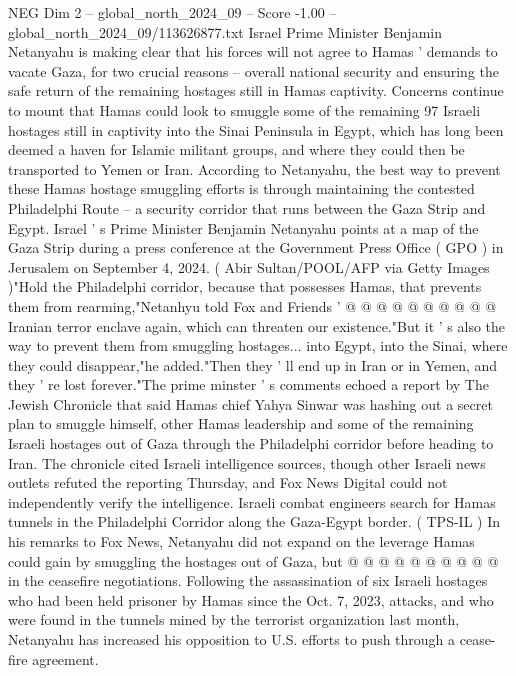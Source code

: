 \begin{textsample}{NEG Dim 2 – global\_north\_2024\_09 – Score -1.00 – global\_north\_2024\_09/113626877.txt}  \label{ex:f2_neg_032}
Israel Prime Minister Benjamin Netanyahu is making clear that his forces will not agree to Hamas ' demands to vacate Gaza, for two crucial reasons -- overall national security and ensuring the safe return of the remaining hostages still in Hamas captivity.
Concerns continue to mount that Hamas could look to smuggle some of the remaining 97 Israeli hostages still in captivity into the Sinai Peninsula in Egypt, which has long been deemed a haven for Islamic militant groups, and where they could then be transported to Yemen or Iran.
According to Netanyahu, the best way to prevent these Hamas hostage smuggling efforts is through maintaining the contested Philadelphi Route -- a security corridor that runs between the Gaza Strip and Egypt.
Israel ' s Prime Minister Benjamin Netanyahu points at a map of the Gaza Strip during a press conference at the Government Press Office ( GPO ) in Jerusalem on September 4, 2024. ( Abir Sultan/POOL/AFP via Getty Images )"Hold the Philadelphi corridor, because that possesses Hamas, that prevents them from rearming,"Netanhyu told Fox and Friends ' @ @ @ @ @ @ @ @ @ @ Iranian terror enclave again, which can threaten our existence."But it ' s also the way to prevent them from smuggling hostages... into Egypt, into the Sinai, where they could disappear,"he added."Then they ' ll end up in Iran or in Yemen, and they ' re lost forever."The prime minster ' s comments echoed a report by The Jewish Chronicle that said Hamas chief Yahya Sinwar was hashing out a secret plan to smuggle himself, other Hamas leadership and some of the remaining Israeli hostages out of Gaza through the Philadelphi corridor before heading to Iran.
The chronicle cited Israeli intelligence sources, though other Israeli news outlets refuted the reporting Thursday, and Fox News Digital could not independently verify the intelligence.
Israeli combat engineers search for Hamas tunnels in the Philadelphi Corridor along the Gaza-Egypt border. ( TPS-IL ) In his remarks to Fox News, Netanyahu did not expand on the leverage Hamas could gain by smuggling the hostages out of Gaza, but @ @ @ @ @ @ @ @ @ @ in the ceasefire negotiations.
Following the assassination of six Israeli hostages who had been held prisoner by Hamas since the Oct. 7, 2023, attacks, and who were found in the tunnels mined by the terrorist organization last month, Netanyahu has increased his opposition to U.S. efforts to push through a cease-fire agreement.

\end{textsample}
